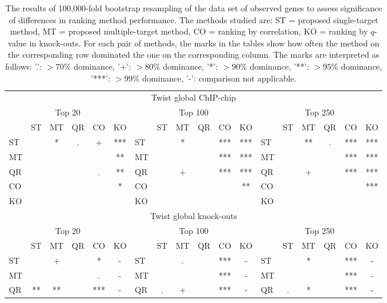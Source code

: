 \documentclass{article}
\begin{document}
\begin{longtable}[c]{lccccc|lccccc|lccccc}
  \caption{The results of 100,000-fold bootstrap resampling of
the data set of observed genes to assess
significance of differences in ranking method performance.  The methods
studied are: ST = proposed single-target method, MT = proposed
multiple-target method, CO = ranking by correlation, KO = ranking by
$q$-value in knock-outs.  For each pair of methods, the marks in the
tables show how often the method on the corresponding row dominated
the one on the corresponding column.  The marks are interpreted as
follows: '.': $> 70 \%$ dominance, '+': $> 80 \%$ dominance,
'*': $> 90 \%$ dominance, '**': $> 95 \%$ dominance, '***': $> 99 \%$
dominance, '-': comparison not applicable.} \\
\multicolumn{18}{c}{Twist global ChIP-chip} \\
\multicolumn{6}{c|}{Top 20} &\multicolumn{6}{c|}{Top 100}  & \multicolumn{6}{c}{Top 250}\\
    & ST  & MT  & QR  & CO  & KO &     & ST  & MT  & QR  & CO  & KO  &     & ST  & MT  & QR  & CO  & KO \\
ST &     & *   & .   & +   & *** & ST &     & *   &     & *** & *** & ST &     & **  & .   & *** & ***\\
MT &     &     &     &     & **  & MT &     &     &     & *** & *** & MT &     &     &     & *** & ***\\
QR &     &     &     & .   & **  & QR &     & +   &     & *** & *** & QR &     & +   &     & *** & ***\\
CO &     &     &     &     & *   & CO &     &     &     &     & **  & CO &     &     &     &     & ***\\
KO &     &     &     &     &     & KO &     &     &     &     &     & KO &     &     &     &     &    \\
\multicolumn{18}{c}{Twist global knock-outs} \\
\multicolumn{6}{c|}{Top 20} &\multicolumn{6}{c|}{Top 100}  & \multicolumn{6}{c}{Top 250}\\
    & ST  & MT  & QR  & CO  & KO &     & ST  & MT  & QR  & CO  & KO  &     & ST  & MT  & QR  & CO  & KO \\
ST &     & +   &     & *   & -   & ST &     & .   &     & *** & -   & ST &     & *   &     & *** & -  \\
MT &     &     &     & .   & -   & MT &     &     &     & *** & -   & MT &     &     &     & *** & -  \\
QR & **  & **  &     & *** & -   & QR & .   & +   &     & *** & -   & QR & .   & *   &     & *** & -  \\

\end{longtable}
\end{document}
